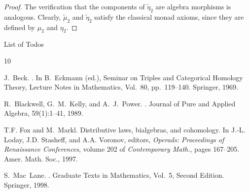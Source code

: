 \documentclass[12pt,leqno]{amsart}
\makeatletter
\def\listtodoname{List of Todos}
\def\listoftodos{\@starttoc{tdo}\listtodoname}
\theoremstyle{definition}
\newcommand{\4}{\texttt{4}}
\makeatother
\begin{document}
\begin{proof}
The verification 
that the components of $\widetilde{\eta}_2$ are algebra morphisms is analogous.
Clearly, $\widetilde{\mu}_2$ and $\widetilde{\eta}_2$ satisfy the classical monad axioms, since they are defined by $\mu_2$ and $\eta_2$.
\end{proof}

\listoftodos

 
\begin{thebibliography}{10}


J.~Beck.
.
\newblock In B.~Eckmann (ed.), Seminar on Triples and Categorical Homology Theory,
Lecture Notes in Mathematics, Vol.~80, pp.~119--140. Springer, 1969.



R.~Blackwell, G.~M.~Kelly, and A.~J.~Power.
.
\newblock Journal of Pure and Applied Algebra, 59(1):1--41, 1989.






T.F. Fox and M.~Markl.
\newblock Distributive laws, bialgebras, and cohomology.
\newblock In J.-L. Loday, J.D. Stasheff, and A.A. Voronov, editors, {\em
  Operads: Proceedings of Renaissance Conferences}, volume 202 of {\em
  Contemporary Math.}, pages 167--205. Amer. Math. Soc., 1997.




S.~Mac~Lane.
.
\newblock Graduate Texts in Mathematics, Vol.~5, Second Edition.
Springer, 1998.



\end{thebibliography}
\end{document}
